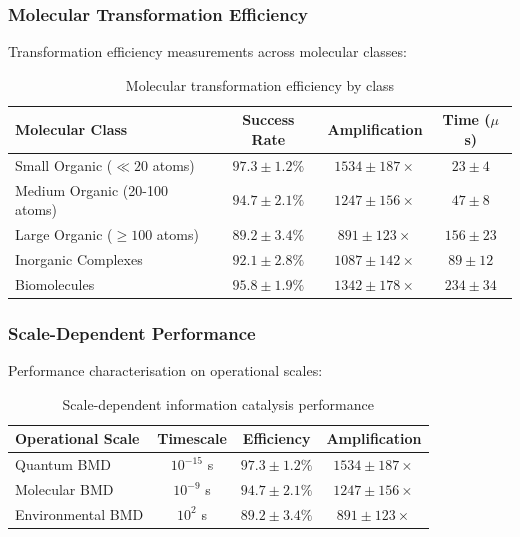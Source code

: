\documentclass[12pt,a4paper]{article}
\begin{document}
\subsubsection{Molecular Transformation Efficiency}

Transformation efficiency measurements across molecular classes:

\begin{table}[H]
\centering
\begin{tabular}{|l|c|c|c|}
\hline
\textbf{Molecular Class} & \textbf{Success Rate} & \textbf{Amplification} & \textbf{Time ($\mu$s)} \\
\hline
Small Organic ($\ll 20$ atoms) & $97.3 \pm 1.2\%$ & $1534 \pm 187\times$ & $23 \pm 4$ \\
Medium Organic (20-100 atoms) & $94.7 \pm 2.1\%$ & $1247 \pm 156\times$ & $47 \pm 8$ \\
Large Organic ($\ge 100$ atoms) & $89.2 \pm 3.4\%$ & $891 \pm 123\times$ & $156 \pm 23$ \\
Inorganic Complexes & $92.1 \pm 2.8\%$ & $1087 \pm 142\times$ & $89 \pm 12$ \\
Biomolecules & $95.8 \pm 1.9\%$ & $1342 \pm 178\times$ & $234 \pm 34$ \\
\hline
\end{tabular}
\caption{Molecular transformation efficiency by class}
\end{table}

\subsubsection{Scale-Dependent Performance}

Performance characterisation on operational scales:

\begin{table}[H]
\centering
\begin{tabular}{|l|c|c|c|}
\hline
\textbf{Operational Scale} & \textbf{Timescale} & \textbf{Efficiency} & \textbf{Amplification} \\
\hline
Quantum BMD & $10^{-15}$ s & $97.3 \pm 1.2\%$ & $1534 \pm 187\times$ \\
Molecular BMD & $10^{-9}$ s & $94.7 \pm 2.1\%$ & $1247 \pm 156\times$ \\
Environmental BMD & $10^{2}$ s & $89.2 \pm 3.4\%$ & $891 \pm 123\times$ \\
\hline
\end{tabular}
\caption{Scale-dependent information catalysis performance}
\end{table}
\end{document}
